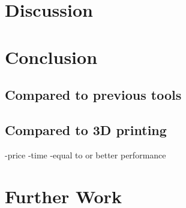 \documentclass[a4paper]{report}
\begin{document}
\chapter{Discussion}\label{Discussion}


\chapter{Conclusion} \label{Conclusion}

\section{Compared to previous tools}

\section{Compared to 3D printing}
-price
-time
-equal to or better performance

\chapter{Further Work} \label{Further Work}

\appendix



%
%
\printbibliography
\end{document}
